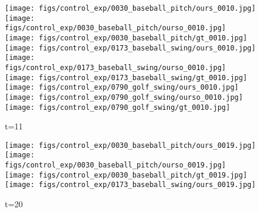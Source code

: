 \documentclass{article}
\begin{document}
\begin{appendix}
\begin{figure*}[!thbp]
    \centering
    \vspace{20pt}
	\begin{subfigure}{0.04\linewidth}
        \raggedleft
    \end{subfigure}
    \begin{subfigure}{0.12\linewidth}
        \caption*{t=11}
        \vspace{-7pt}
	    \texttt{[image: figs/control\_exp/0030\_baseball\_pitch/ours\_0010.jpg]}
	    \texttt{[image: figs/control\_exp/0030\_baseball\_pitch/ourso\_0010.jpg]}
	    \vspace{.2cm}
  		\texttt{[image: figs/control\_exp/0030\_baseball\_pitch/gt\_0010.jpg]}
  		\texttt{[image: figs/control\_exp/0173\_baseball\_swing/ours\_0010.jpg]}
  		\texttt{[image: figs/control\_exp/0173\_baseball\_swing/ourso\_0010.jpg]}
  		\vspace{.2cm}
  		\texttt{[image: figs/control\_exp/0173\_baseball\_swing/gt\_0010.jpg]}
  		\texttt{[image: figs/control\_exp/0790\_golf\_swing/ours\_0010.jpg]}
  		\texttt{[image: figs/control\_exp/0790\_golf\_swing/ourso\_0010.jpg]}
  		\vspace{.2cm}
  		\texttt{[image: figs/control\_exp/0790\_golf\_swing/gt\_0010.jpg]}
	\end{subfigure} 
    \begin{subfigure}{0.12\linewidth}
        \caption*{t=20}
        \vspace{-7pt}
	    \texttt{[image: figs/control\_exp/0030\_baseball\_pitch/ours\_0019.jpg]}
	    \texttt{[image: figs/control\_exp/0030\_baseball\_pitch/ourso\_0019.jpg]}
	    \vspace{.2cm}
  		\texttt{[image: figs/control\_exp/0030\_baseball\_pitch/gt\_0019.jpg]}
  		\texttt{[image: figs/control\_exp/0173\_baseball\_swing/ours\_0019.jpg]}

\end{subfigure}
\end{figure*}
\end{appendix}
\end{document}
